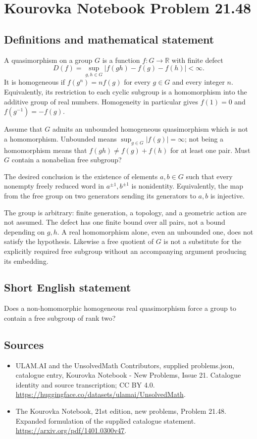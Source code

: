 \documentclass[11pt,a4paper]{article}
\begin{document}
\section*{Kourovka Notebook Problem 21.48}\label{statement}

\subsection{Definitions and mathematical statement}
A quasimorphism on a group $G$ is a function $f:G\to\mathbb R$ with
finite defect
\[
 D(f)=\sup_{g,h\in G}|f(gh)-f(g)-f(h)|<\infty.
\]
It is homogeneous if $f(g^n)=nf(g)$ for every $g\in G$ and every
integer $n$. Equivalently, its restriction to each cyclic subgroup is
a homomorphism into the additive group of real numbers. Homogeneity
in particular gives $f(1)=0$ and $f(g^{-1})=-f(g)$.

Assume that $G$ admits an unbounded homogeneous quasimorphism which is
not a homomorphism. Unbounded means $\sup_{g\in G}|f(g)|=\infty$;
not being a homomorphism means that $f(gh)\ne f(g)+f(h)$ for at least
one pair. Must $G$ contain a nonabelian free subgroup?

The desired conclusion is the existence of elements $a,b\in G$ such
that every nonempty freely reduced word in $a^{\pm1},b^{\pm1}$ is
nonidentity. Equivalently, the map from the free group on two generators
sending its generators to $a,b$ is injective.

The group is arbitrary: finite generation, a topology, and a geometric
action are not assumed. The defect has one finite bound over all pairs,
not a bound depending on $g,h$. A real homomorphism alone, even an
unbounded one, does not satisfy the hypothesis. Likewise a free quotient
of $G$ is not a substitute for the explicitly required free subgroup
without an accompanying argument producing its embedding.
\subsection{Short English statement}
Does a non-homomorphic homogeneous real quasimorphism force a group to contain a free subgroup of rank two?
\subsection{Sources}
\begin{itemize}
\item[S1] ULAM.AI and the UnsolvedMath Contributors, supplied problems.json, catalogue entry, Kourovka Notebook - New Problems, Issue 21. Catalogue identity and source transcription; CC BY 4.0.
\url{https://huggingface.co/datasets/ulamai/UnsolvedMath}.
\item[S2] The Kourovka Notebook, 21st edition, new problems, Problem 21.48. Expanded formulation of the supplied catalogue statement.
\url{https://arxiv.org/pdf/1401.0300v47}.
\end{itemize}
\end{document}
